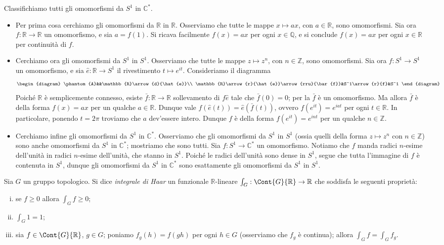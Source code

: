 \begin{example}
Classifichiamo tutti gli omomorfismi da $S^1$ in $\mathbb{C}^*$.
\begin{itemize}
\item Per prima cosa cerchiamo gli omomorfismi da $\mathbb{R}$ in $\mathbb{R}$. Osserviamo che tutte le mappe $x\mapsto ax$, con $a\in\mathbb{R}$, sono omomorfismi. Sia ora $f:\mathbb{R}\to\mathbb{R}$ un omomorfismo, e sia $a=f(1)$. Si ricava facilmente $f(x)=ax$ per ogni $x\in\mathbb{Q}$, e si conclude $f(x)=ax$ per ogni $x\in\mathbb{R}$ per continuità di $f$.
\item Cerchiamo ora gli omomorfismi da $S^1$ in $S^1$. Osserviamo che tutte le mappe $z\mapsto z^n$, con $n\in\mathbb{Z}$, sono omomorfismi. Sia ora $f:S^1\to S^1$ un omomorfismo, e sia $\hat{e}:\mathbb{R}\to S^1$ il rivestimento $t\mapsto e^{it}$. Consideriamo il diagramma
$$
\begin{diagram}
\phantom{A}&&\mathbb{R}\arrow{d}{\hat{e}}\\
\mathbb{R}\arrow{r}{\hat{e}}\arrow{rru}{\bar{f}}&S^1\arrow{r}{f}&S^1
\end{diagram}
$$
Poiché $\mathbb{R}$ è semplicemente connesso, esiste $\bar{f}:\mathbb{R}\to\mathbb{R}$ sollevamento di $f\hat{e}$ tale che $\bar{f}(0)=0$; per la  $\bar{f}$ è un omomorfismo. Ma allora $\bar{f}$ è della forma $f(x)=ax$ per un qualche $a\in\mathbb{R}$. Dunque vale $f(\hat{e}(t))=\hat{e}(\bar{f}(t))$, ovvero $f(e^{it})=e^{iat}$ per ogni $t\in\mathbb{R}$. In particolare, ponendo $t=2\pi$ troviamo che $a$ dev'essere intero. Dunque $f$ è della forma $f(e^{it})=e^{int}$ per un qualche $n\in\mathbb{Z}$.
\item Cerchiamo infine gli omomorfismi da $S^1$ in $\mathbb{C}^*$. Osserviamo che gli omomorfismi da $S^1$ in $S^1$ (ossia quelli della forma $z\mapsto z^n$ con $n\in\mathbb{Z}$) sono anche omomorfismi da $S^1$ in $\mathbb{C}^*$; mostriamo che sono tutti. Sia $f:S^1\to\mathbb{C}^*$ un omomorfismo. Notiamo che $f$ manda radici $n$-esime dell'unità in radici $n$-esime dell'unità, che stanno in $S^1$. Poiché le radici dell'unità sono dense in $S^1$, segue che tutta l'immagine di $f$ è contenuta in $S^1$, dunque gli omomorfismi da $S^1$ in $\mathbb{C}^*$ sono esattamente gli omomorfismi da $S^1$ in $S^1$.
\end{itemize}
\end{example}

\begin{definition}
Sia $G$ un gruppo topologico. Si dice \emph{integrale di Haar} un funzionale $\mathbb{R}$-lineare $\int_G:\Cont{G}{\mathbb{R}}\to\mathbb{R}$ che soddisfa le seguenti proprietà:
\begin{enumerate}[(i)]
\item se $f\ge0$ allora $\int_Gf\ge 0$;
\item $\int_G1=1$;
\item sia $f\in\Cont{G}{\mathbb{R}}$, $g\in G$; poniamo $f_g(h)=f(gh)$ per ogni $h\in G$ (osserviamo che $f_g$ è continua); allora $\int_Gf=\int_Gf_g$.
\end{enumerate}
\end{definition}

